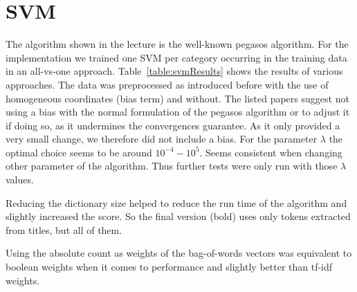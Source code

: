 \documentclass{article}
\begin{document}
\vspace{-2mm}
\section*{SVM}
The algorithm shown in the lecture is the well-known pegasos algorithm\cite{shalev-shwartz_pegasos:_2011,shalev-shwartz_pegasos:_????}. For the implementation we trained one SVM per category occurring in the training data in an all-vs-one approach.
Table~\ref{table:svmResults} shows the results of various approaches.
The data was preprocessed as introduced before with the use of homogeneous coordinates (bias term) and without. The listed papers suggest not using a bias with the normal formulation of the pegasos algorithm or to adjust it if doing so, as it undermines the convergences guarantee. As it only provided a very small change, we therefore did not include a bias. For the parameter $\lambda$ the optimal choice seems to be around $10^{-4} - 10^{5}$. Seems consistent when changing other parameter of the algorithm. Thus further tests were only run with those $\lambda$ values.

Reducing the dictionary size helped to reduce the run time of the algorithm and slightly increased the score. So the final version (bold) uses only tokens extracted from titles, but all of them.

Using the absolute count as weights of the bag-of-words vectors was equivalent to boolean weights when it comes to performance and slightly better than tf-idf weights.
\end{document}
